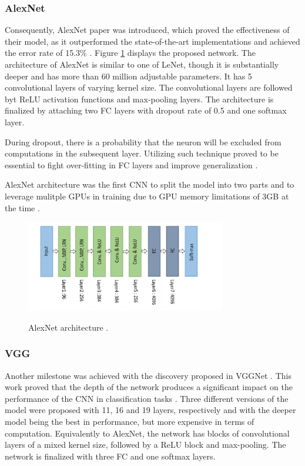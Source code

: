 \subsubsection{AlexNet}
\label{alexnet_section} 
Consequently, AlexNet paper was introduced, which proved the effectiveness of their model, as it outperformed the state-of-the-art implementations and achieved the error rate of 15.3\% \cite{NIPS2012_c399862d}. Figure \ref{AlexNet} displays the proposed network. The architecture of AlexNet is similar to one of LeNet, though it is substantially deeper and has more than 60 million adjustable parameters. It has 5 convolutional layers of varying kernel size. The convolutional layers are followed byt ReLU activation functions and max-pooling layers. The architecture is finalized by attaching two FC layers with dropout rate of 0.5 and one softmax layer.

During dropout, there is a probability that the neuron will be excluded from computations in the subsequent layer. Utilizing such technique proved to be essential to fight over-fitting in FC layers and improve generalization  \cite{JMLR:v15:srivastava14a}. 

AlexNet architecture was the first CNN to split the model into two parts and to leverage mulitple GPUs in training due to GPU memory limitations of 3GB at the time \cite{NIPS2012_c399862d}. 

\begin{figure}[htb]
	\begin{center}
		\includegraphics[height=4cm]{./AlexNet.png}
	\end{center}
	\caption{AlexNet architecture \cite{alom01}.}
	\begin{center}
		\label{AlexNet}
	\end{center}
\end{figure}
\FloatBarrier

\subsubsection{VGG}
Another milestone was achieved with the discovery proposed in VGGNet \cite{Simonyan2014}. This work proved that the depth of the network produces a significant impact on the performance of the CNN in classification tasks \cite{alom01}. Three different versions of the model were proposed with 11, 16 and 19 layers, respectively and with the deeper model being the best in performance, but more expensive in terms of computation. Equivalently to AlexNet, the network has blocks of convolutional layers of a mixed kernel size, followed by a ReLU block and max-pooling. The network is finalized with three FC and one softmax layers. 

